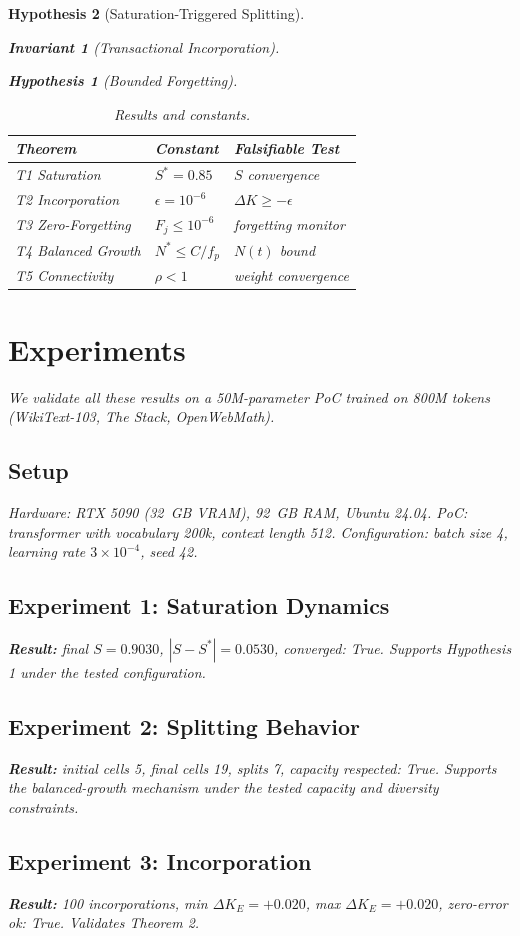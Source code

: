 \documentclass[11pt,a4paper]{article}
\newtheorem{invariant}{Invariant}
\newtheorem{hypothesis}{Hypothesis}
\begin{document}
\begin{hypothesis}[Saturation-Triggered Splitting]
\begin{invariant}[Transactional Incorporation]
\begin{hypothesis}[Bounded Forgetting]
\begin{table}[h]
\centering
\caption{Results and constants.}
\label{tab:theorems}
\begin{tabular}{lll}
\hline
Theorem & Constant & Falsifiable Test \\
\hline
T1 Saturation & $S^* = 0.85$ & $S$ convergence \\
T2 Incorporation & $\epsilon = 10^{-6}$ & $\Delta K \geq -\epsilon$ \\
T3 Zero-Forgetting & $F_j \leq 10^{-6}$ & forgetting monitor \\
T4 Balanced Growth & $N^* \leq C/f_p$ & $N(t)$ bound \\
T5 Connectivity & $\rho < 1$ & weight convergence \\
\hline
\end{tabular}
\end{table}

\section{Experiments}
\label{sec:exp}

We validate all these results on a 50M-parameter PoC trained
on 800M tokens (WikiText-103, The Stack, OpenWebMath).

\subsection{Setup}
Hardware: RTX 5090 (32~GB VRAM), 92~GB RAM, Ubuntu 24.04.
PoC: transformer with vocabulary 200k, context length 512.
Configuration: batch size 4, learning rate $3 \times 10^{-4}$,
seed 42.

\subsection{Experiment 1: Saturation Dynamics}
\textbf{Result:} final $S = 0.9030$, $|S - S^*| = 0.0530$,
converged: True. Supports Hypothesis 1 under the tested configuration.

\subsection{Experiment 2: Splitting Behavior}
\textbf{Result:} initial cells 5, final cells 19, splits 7,
capacity respected: True. Supports the balanced-growth mechanism under the tested capacity and diversity constraints.

\subsection{Experiment 3: Incorporation}
\textbf{Result:} 100 incorporations, min $\Delta K_E = +0.020$,
max $\Delta K_E = +0.020$, zero-error ok: True. Validates
Theorem 2.


\end{hypothesis}
\end{invariant}
\end{hypothesis}
\end{document}
